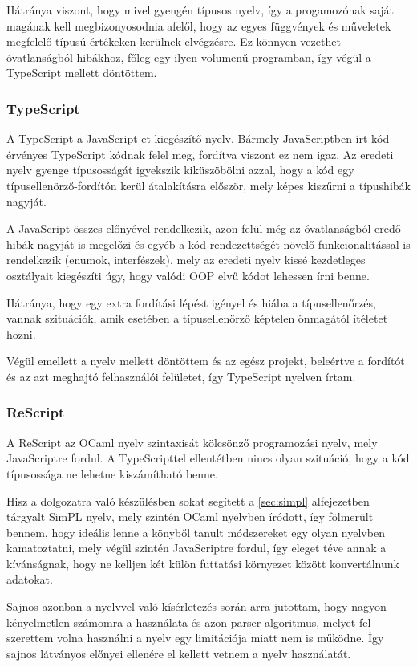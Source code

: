 Hátránya viszont, hogy mivel gyengén típusos nyelv, így a progamozónak saját magának kell megbizonyosodnia afelől, hogy az egyes függvények és műveletek megfelelő típusú értékeken kerülnek elvégzésre. Ez könnyen vezethet óvatlanságból hibákhoz, főleg egy ilyen volumenű programban, így végül a TypeScript mellett döntöttem.

\subsubsection{TypeScript}

A TypeScript a JavaScript-et kiegészítő nyelv. Bármely JavaScriptben írt kód érvényes TypeScript kódnak felel meg, fordítva viszont ez nem igaz. Az eredeti nyelv gyenge típusosságát igyekszik kiküszöbölni azzal, hogy a kód egy típusellenörző-fordítón kerül átalakításra először, mely képes kiszűrni a típushibák nagyját.

A JavaScript összes előnyével rendelkezik, azon felül még az óvatlanságból eredő hibák nagyját is megelőzi és egyéb a kód rendezettségét növelő funkcionalitással is rendelkezik (enumok, interfészek), mely az eredeti nyelv kissé kezdetleges osztályait kiegészíti úgy, hogy valódi OOP elvű kódot lehessen írni benne.

Hátránya, hogy egy extra fordítási lépést igényel és hiába a típusellenőrzés, vannak szituációk, amik esetében a típusellenörző képtelen önmagától ítéletet hozni.

Végül emellett a nyelv mellett döntöttem és az egész projekt, beleértve a fordítót és az azt meghajtó felhasználói felületet, így TypeScript nyelven írtam.

\subsubsection{ReScript}

A ReScript az OCaml nyelv szintaxisát kölcsönző programozási nyelv, mely JavaScriptre fordul. A TypeScripttel ellentétben nincs olyan szituáció, hogy a kód típusossága ne lehetne kiszámítható benne.

Hisz a dolgozatra való készülésben sokat segített a \ref{sec:simpl} alfejezetben tárgyalt SimPL nyelv, mely szintén OCaml nyelvben íródott, így fölmerült bennem, hogy ideális lenne a könyből tanult módszereket egy olyan nyelvben kamatoztatni, mely végül szintén JavaScriptre fordul, így eleget téve annak a kívánságnak, hogy ne kelljen két külön futtatási környezet között konvertálnunk adatokat.

Sajnos azonban a nyelvvel való kísérletezés során arra jutottam, hogy nagyon kényelmetlen számomra a használata és azon parser algoritmus, melyet fel szerettem volna használni a nyelv egy limitációja miatt nem is működne. Így sajnos látványos előnyei ellenére el kellett vetnem a nyelv használatát.